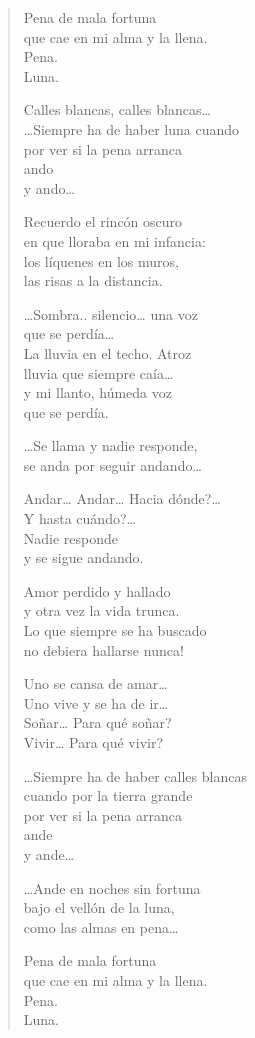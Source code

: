 \documentclass[12pt]{article}
\begin{document}
\clearpage
{}
\begin{verse}

Pena de mala fortuna\\
que cae en mi alma y la llena.\\
Pena.\\
Luna.  

Calles blancas, calles blancas\ldots{}\\
\ldots{}Siempre ha de haber luna cuando\\
por ver si la pena arranca\\
ando\\
y ando\ldots{}  

Recuerdo el rincón oscuro\\
en que lloraba en mi infancia:\\
los líquenes en los muros,\\
las risas a la distancia.  

\ldots{}Sombra.. silencio\ldots{} una voz\\
que se perdía\ldots{}\\
La lluvia en el techo. Atroz\\
lluvia que siempre caía\ldots{}\\
y mi llanto, húmeda voz\\
que se perdía.  

\ldots{}Se llama y nadie responde,\\
se anda por seguir andando\ldots{}  

Andar\ldots{} Andar\ldots{} Hacia dónde?\ldots{}\\
Y hasta cuándo?\ldots{}\\
Nadie responde\\
y se sigue andando.  

Amor perdido y hallado\\
y otra vez la vida trunca.\\
Lo que siempre se ha buscado\\
no debiera hallarse nunca!  

Uno se cansa de amar\ldots{}\\
Uno vive y se ha de ir\ldots{}\\
Soñar\ldots{} Para qué soñar?\\
Vivir\ldots{} Para qué vivir?  

\ldots{}Siempre ha de haber calles blancas\\
cuando por la tierra grande\\
por ver si la pena arranca\\
ande\\
y ande\ldots{}  

\ldots{}Ande en noches sin fortuna\\
bajo el vellón de la luna,\\
como las almas en pena\ldots{}  

Pena de mala fortuna\\
que cae en mi alma y la llena.\\
Pena.\\
Luna.

\end{verse}
\end{document}
